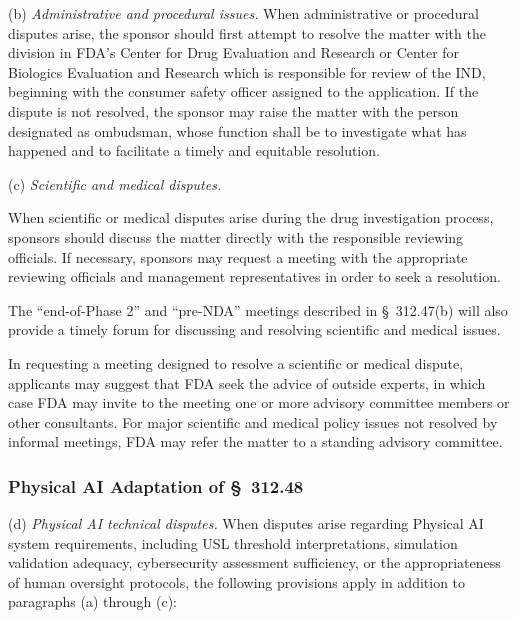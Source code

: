 \documentclass[11pt]{article}
\begin{document}
(b) \textit{Administrative and procedural issues.} When administrative or procedural disputes arise, the sponsor should first attempt to resolve the matter with the division in FDA's Center for Drug Evaluation and Research or Center for Biologics Evaluation and Research which is responsible for review of the IND, beginning with the consumer safety officer assigned to the application. If the dispute is not resolved, the sponsor may raise the matter with the person designated as ombudsman, whose function shall be to investigate what has happened and to facilitate a timely and equitable resolution.

(c) \textit{Scientific and medical disputes.}

\begin{description}[leftmargin=0.5cm,style=sameline]
\item[(1)] When scientific or medical disputes arise during the drug investigation process, sponsors should discuss the matter directly with the responsible reviewing officials. If necessary, sponsors may request a meeting with the appropriate reviewing officials and management representatives in order to seek a resolution.
\item[(2)] The ``end-of-Phase 2'' and ``pre-NDA'' meetings described in \S~312.47(b) will also provide a timely forum for discussing and resolving scientific and medical issues.
\item[(3)] In requesting a meeting designed to resolve a scientific or medical dispute, applicants may suggest that FDA seek the advice of outside experts, in which case FDA may invite to the meeting one or more advisory committee members or other consultants. For major scientific and medical policy issues not resolved by informal meetings, FDA may refer the matter to a standing advisory committee.
\end{description}

\subsubsection{Physical AI Adaptation of \S~312.48}

(d) \textit{Physical AI technical disputes.} When disputes arise regarding Physical AI system requirements, including USL threshold interpretations, simulation validation adequacy, cybersecurity assessment sufficiency, or the appropriateness of human oversight protocols, the following provisions apply in addition to paragraphs (a) through (c):
\end{document}
